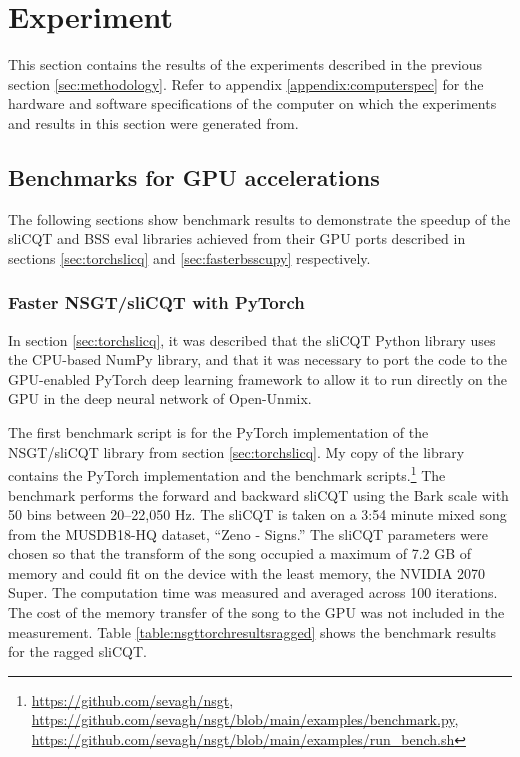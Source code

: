 \documentclass[report.tex]{subfiles}
\begin{document}
\section{Experiment}
\label{sec:experiment}


This section contains the results of the experiments described in the previous section \ref{sec:methodology}. Refer to appendix \ref{appendix:computerspec} for the hardware and software specifications of the computer on which the experiments and results in this section were generated from.

\subsection{Benchmarks for GPU accelerations}

The following sections show benchmark results to demonstrate the speedup of the sliCQT and BSS eval libraries achieved from their GPU ports described in sections \ref{sec:torchslicq} and \ref{sec:fasterbsscupy} respectively.

\subsubsection{Faster NSGT/sliCQT with PyTorch}
\label{sec:torchslicqresults}

In section \ref{sec:torchslicq}, it was described that the sliCQT Python library uses the CPU-based NumPy library, and that it was necessary to port the code to the GPU-enabled PyTorch deep learning framework to allow it to run directly on the GPU in the deep neural network of Open-Unmix.

The first benchmark script is for the PyTorch implementation of the NSGT/sliCQT library from section \ref{sec:torchslicq}. My copy of the library contains the PyTorch implementation and the benchmark scripts.\footnote{\url{https://github.com/sevagh/nsgt}, \url{https://github.com/sevagh/nsgt/blob/main/examples/benchmark.py}, \url{https://github.com/sevagh/nsgt/blob/main/examples/run_bench.sh}} The benchmark performs the forward and backward sliCQT using the Bark scale with 50 bins between 20--22,050 Hz. The sliCQT is taken on a 3:54 minute mixed song from the MUSDB18-HQ dataset, ``Zeno - Signs.'' The sliCQT parameters were chosen so that the transform of the song occupied a maximum of 7.2 GB of memory and could fit on the device with the least memory, the NVIDIA 2070 Super. The computation time was measured and averaged across 100 iterations. The cost of the memory transfer of the song to the GPU was not included in the measurement. Table \ref{table:nsgttorchresultsragged} shows the benchmark results for the ragged sliCQT.
\end{document}

